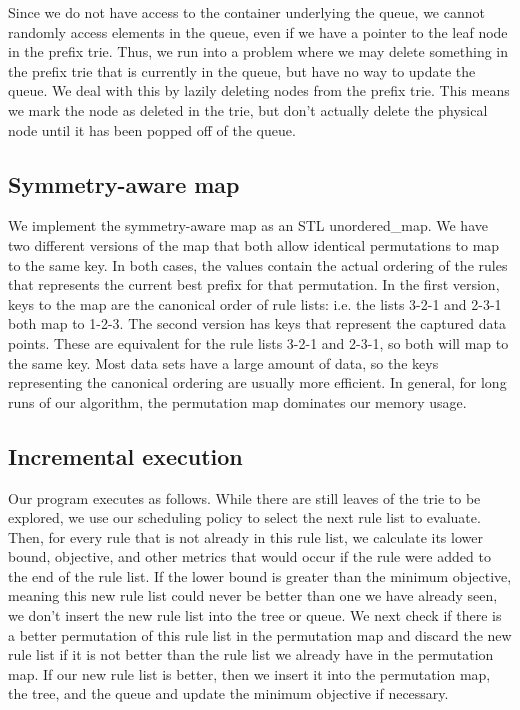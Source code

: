 \documentclass[]{article}
\begin{document}
Since we do not have access to the container underlying the queue, we cannot randomly access elements in the queue, even if we have a pointer to the leaf node in the prefix trie.
Thus, we run into a problem where we may delete something in the prefix trie that is currently in the queue, but have no way to update the queue.
We deal with this by lazily deleting nodes from the prefix trie.
This means we mark the node as deleted in the trie, but don't actually delete the physical node until it has been popped off of the queue.

\subsection{Symmetry-aware map}
We implement the symmetry-aware map as an STL unordered\_map. We have two different versions of the map that both allow identical permutations to map to the same key. In both cases, the values contain the actual ordering of the rules that represents the current best prefix for that permutation. In the first version, keys to the map are the canonical order of rule lists: i.e. the lists 3-2-1 and 2-3-1 both map to 1-2-3. The second version has keys that represent the captured data points. These are equivalent for the rule lists 3-2-1 and 2-3-1, so both will map to the same key. Most data sets have a large amount of data, so the keys representing the canonical ordering are usually more efficient. In general, for long runs of our algorithm, the permutation map dominates our memory usage.

\subsection{Incremental execution}
Our program executes as follows. While there are still leaves of the trie to be explored, we use our scheduling policy to select the next rule list to evaluate. Then, for every rule that is not already in this rule list, we calculate its lower bound, objective, and other metrics that would occur if the rule were added to the end of the rule list. If the lower bound is greater than the minimum objective, meaning this new rule list could never be better than one we have already seen, we don't insert the new rule list into the tree or queue. We next check if there is a better permutation of this rule list in the permutation map and discard the new rule list if it is not better than the rule list we already have in the permutation map. If our new rule list is better, then we insert it into the permutation map, the tree, and the queue and update the minimum objective if necessary.
\end{document}
